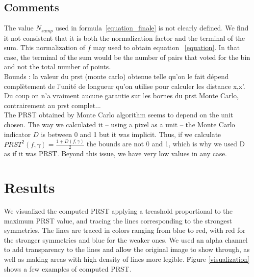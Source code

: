 \documentclass[10pt,a4paper]{article}                        %
\begin{document}
          \subsection{Comments}
          \label{comments}
          The value $N_{samp}$ used in formula~\eqref{equation_finale} is not clearly defined. We find it not consistent that it is both the normalization factor and the terminal of the sum. This normalization of $f$ may used to obtain equation ~\eqref{equation}. In that case, the terminal of the sum would be the number of pairs that voted for the bin and not the total number of points.\\
          
          Bounds : la valeur du prst (monte carlo) obtenue telle qu'on le fait dépend complètement de l'unité de longueur qu'on utilise pour calculer les distance x,x'. Du coup on n'a vraiment aucune garantie sur les bornes du prst Monte Carlo, contrairement au prst complet...\\
          
        The PRST obtained by Monte Carlo algorithm seems to depend on the unit chosen. The way we calculated it -- using a pixel as a unit -- the Monte Carlo indicator $D$ is  between 0 and 1 but it was implicit. Thus, if we calculate $PRST^2(f,\gamma) = \frac{1 + D(f,\gamma)}{2}$ the bounds are not 0 and 1, which is why we used D as if it was PRST. Beyond this issue, we have very low values in any case.
          
          
          \section{Results}

We visualized the computed PRST applying a treashold proportional to the maximum PRST value, and tracing the lines corresponding to the strongest symmetries. The lines are traced in colors ranging from blue to red, with red for the stronger symmetries and blue for the weaker ones. We used an alpha channel to add transparency to the lines and allow the original image to show through, as well as making areas with high density of lines more legible. Figure \ref{visualization} shows a few examples of computed PRST.
\end{document}
